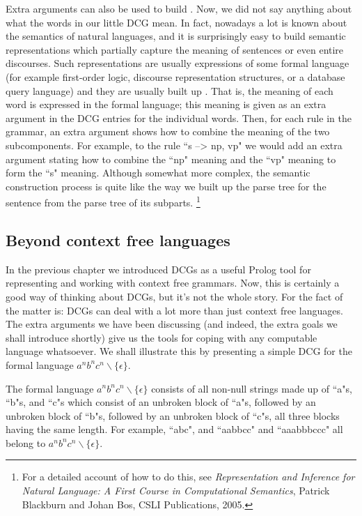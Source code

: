 Extra arguments can also be used to build .  Now, we did not say anything about what the words
in our little DCG mean.  In fact, nowadays a lot is known about the
semantics of natural languages, and it is surprisingly easy to build
semantic representations which partially capture the meaning of
sentences or even entire discourses.  Such representations are usually
expressions of some formal language (for example first-order logic,
discourse representation structures, or a database query language) and
they are usually built up .  That is, the
meaning of each word is expressed in the formal language; this meaning
is given as an extra argument in the DCG entries for the individual
words.  Then, for each rule in the grammar, an extra argument shows
how to combine the meaning of the two subcomponents.  For example, to
the rule ``s --> np, vp" we would add an extra argument stating how to
combine the ``np" meaning and the ``vp" meaning to form the ``s" meaning.
Although somewhat more complex, the semantic construction process is
quite like the way we built up the parse tree for the sentence from
the parse tree of its subparts.%
\footnote{For a detailed account of how to do this, see
\textit{Representation and Inference for Natural Language: A First
Course in Computational Semantics}, Patrick Blackburn and Johan Bos,
CSLI Publications, 2005.}


\subsection*{Beyond context free languages}\label{SUBSEC.L8.NON.CONTEXT.FREE}



In the previous chapter we introduced DCGs as a useful Prolog tool for
representing and working with context free grammars. Now, this is
certainly a good way of thinking about DCGs, but it's not the whole
story. For the fact of the matter is: DCGs can deal with a lot more
than just context free languages. The extra arguments we have been
discussing (and indeed, the extra goals we shall introduce shortly)
give us the tools for coping with any computable language
whatsoever. We shall illustrate this by presenting a simple DCG for the
formal language $a^nb^nc^n \backslash \{ \epsilon \}$.

The formal language $a^nb^nc^n \backslash \{ \epsilon \}$  consists
of all non-null strings made up of ``a"s, ``b"s, and ``c"s which consist
of an unbroken block of ``a"s, followed by an unbroken block of ``b"s,
followed by an unbroken block of ``c"s, all three blocks having the
same length. For example, ``abc", and ``aabbcc" and ``aaabbbccc" all
belong to
$a^nb^nc^n \backslash \{ \epsilon \}$.

